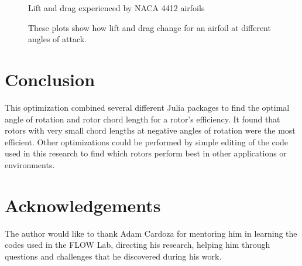 \documentclass[journal ]{new-aiaa}
\begin{document}
\begin{figure}[H]
\centering
	\caption{Lift and drag experienced by NACA 4412 airfoils}
	\captionsetup{aboveskip=0pt,font=it}
	\caption*{These plots show how lift and drag change for an airfoil at different angles of attack.}
	\label{fig:8}
\end{figure}


\section{Conclusion}

This optimization combined several different Julia packages to find the optimal angle of rotation and rotor chord length for a rotor's efficiency. It found that rotors with very small chord lengths at negative angles of rotation were the most efficient. Other optimizations could be performed by simple editing of the code used in this research to find which rotors perform best in other applications or environments. 


\section{Acknowledgements}

The author would like to thank Adam Cardoza for mentoring him in learning the codes used in the FLOW Lab, directing his research, helping him through questions and challenges that he discovered during his work.




\end{document}
